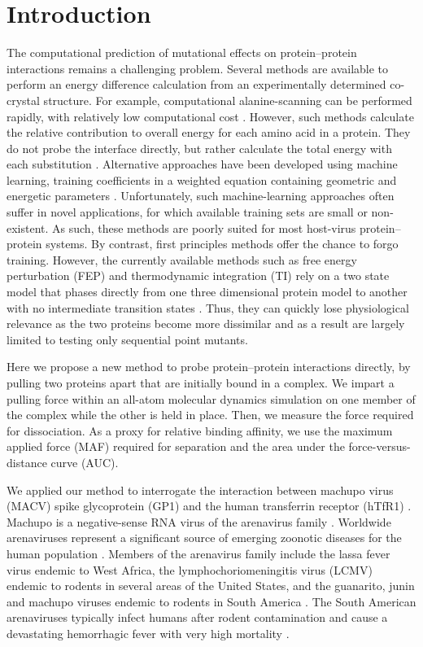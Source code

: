 \documentclass[12pt]{article}
\begin{document}
\section*{Introduction}
The computational prediction of mutational effects on protein--protein interactions remains a challenging problem. Several methods are available to perform an energy difference calculation from an experimentally determined co-crystal structure. For example, computational alanine-scanning can be performed rapidly, with relatively low computational cost \citep{Grant2011,Kortemme2004}. However, such methods calculate the relative contribution to overall energy for each amino acid in a protein. They do not probe the interface directly, but rather calculate the total energy with each substitution \citep{Grant2011,Kortemme2004}. Alternative approaches have been developed using machine learning, training coefficients in a weighted equation containing geometric and energetic parameters \citep{Vreven2011,Vreven2012,Bajaj2011,Hwang2010}. Unfortunately, such machine-learning approaches often suffer in novel applications, for which available training sets are small or non-existent. As such, these methods are poorly suited for most host-virus protein--protein systems. By contrast, first principles methods offer the chance to forgo training. However, the currently available methods such as free energy perturbation (FEP) and thermodynamic integration (TI) rely on a two state model that phases directly from one three dimensional protein model to another with no intermediate transition states \citep{Gilson1997,Lu2004}. Thus, they can quickly lose physiological relevance as the two proteins become more dissimilar and as a result are largely limited to testing only sequential point mutants. 

Here we propose a new method to probe protein--protein interactions directly, by pulling two proteins apart that are initially bound in a complex. We impart a pulling force within an all-atom molecular dynamics simulation on one member of the complex while the other is held in place. Then, we measure the force required for dissociation. As a proxy for relative binding affinity, we use the maximum applied force (MAF) required for separation and the area under the force-versus-distance curve (AUC). 

We applied our method to interrogate the interaction between machupo virus (MACV) spike glycoprotein (GP1) and the human transferrin receptor (hTfR1) \citep{Abraham2010,Charrel2003}. Machupo is a negative-sense RNA virus of the arenavirus family \citep{Charrel2003}. Worldwide arenaviruses represent a significant source of emerging zoonotic diseases for the human population \citep{Charrel2003}. Members of the arenavirus family include the lassa fever virus endemic to West Africa, the lymphochoriomeningitis virus (LCMV) endemic to rodents in several areas of the United States, and the guanarito, junin and machupo viruses endemic to rodents in South America \citep{Charrel2003}. The South American arenaviruses typically infect humans after rodent contamination and cause a devastating hemorrhagic fever with very high mortality \citep{Charrel2003}.
\end{document}
